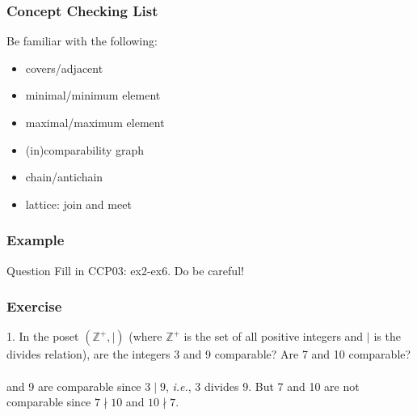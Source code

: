 \documentclass{beamer}
\begin{document}
\begin{frame}
    \frametitle{Concept Checking List}
    Be familiar with the following:
    \begin{itemize}
        \item covers/adjacent
        \item minimal/minimum element
        \item maximal/maximum element
        \item (in)comparability graph
        \item chain/antichain
        \item lattice: join and meet
    \end{itemize}
    \vv
\end{frame}
\begin{frame}
    \frametitle{Example}
    \begin{block}{Question}
        \hh Fill in CCP03: ex2-ex6. Do be careful!
    \end{block}
\end{frame}
\begin{frame}
    \frametitle{Exercise}
    1. In the poset $(\mathbb{Z}^+, \mid)$ (where $\mathbb{Z}^+$ is the set of 
    all positive integers and $\mid$ is the divides relation), are the integers 3 and 9 comparable? 
    Are 7 and 10 comparable? \\
    \vs{2em}
    \pause
    \\
     and 9 are comparable since $3 \mid 9$, \textit{i.e.}, 
    3 divides 9. But 7 and 10 are not comparable since $7 \nmid 10$  
    and $10 \nmid 7$. 
\end{frame}
\end{document}

